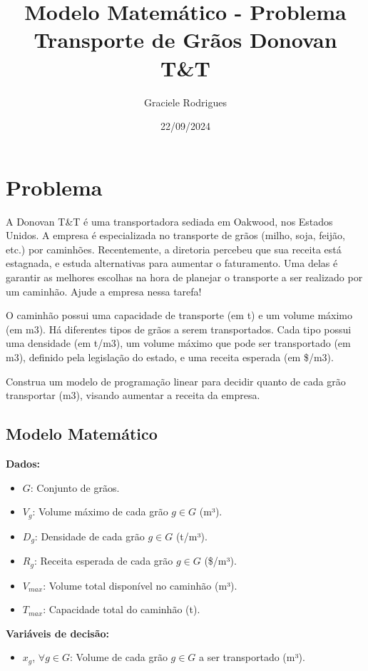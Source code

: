 \documentclass{article}
\begin{document}
\title{Modelo Matemático - Problema Transporte de Grãos Donovan T\&T}
\author{Graciele Rodrigues}
\date{22/09/2024}
\maketitle


\section*{Problema}

A Donovan T\&T é uma transportadora sediada em Oakwood, nos Estados Unidos. A empresa é especializada no transporte de grãos (milho, soja, feijão, etc.) por caminhões. Recentemente, a diretoria percebeu que sua receita está estagnada, e estuda alternativas para aumentar o faturamento. Uma delas é garantir as melhores escolhas na hora de planejar o transporte a ser realizado por um caminhão. Ajude a empresa nessa tarefa!

O caminhão possui uma capacidade de transporte (em t) e um volume máximo (em m3). Há diferentes tipos de grãos a serem transportados. Cada tipo possui uma densidade (em t/m3), um volume máximo que pode ser transportado (em m3), definido pela legislação do estado, e uma receita esperada (em \$/m3).

Construa um modelo de programação linear para decidir quanto de cada grão transportar (m3), visando aumentar a receita da empresa.

\subsection*{Modelo Matemático}

\textbf{Dados:}
\begin{itemize}
    \item $G$: Conjunto de grãos.
    \item $V_g$: Volume máximo de cada grão $g \in G$ (m³).
    \item $D_g$: Densidade de cada grão $g \in G$ (t/m³).
    \item $R_g$: Receita esperada de cada grão $g \in G$ (\$/m³).
    \item $V_{max}$: Volume total disponível no caminhão (m³).
    \item $T_{max}$: Capacidade total do caminhão (t).
\end{itemize}

\textbf{Variáveis de decisão:}
\begin{itemize}
    \item $x_g$, $\forall g \in G$: Volume de cada grão $g \in G$ a ser transportado (m³).
\end{itemize}
\end{document}
